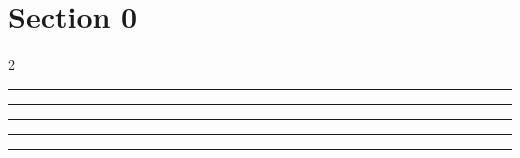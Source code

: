 \documentclass[11pt,a4paper]{article}
\begin{document}
\section{Section 0}
\begin{multicols}{2}
\begin{swarmwrap}%
  \begin{minipage}[t]{2cm}
    \centering
    \textcolor{blue!30}{\rule{\linewidth}{2cm}}
  \end{minipage}%
\end{swarmwrap}%
\swarmwrapnext\lipsum[1]\lipsum[2]
\end{multicols}

\begin{swarmwrap}%
  \begin{minipage}[t]{3cm}
    \centering
    \textcolor{red!20}{\rule{\linewidth}{3cm}}
  \end{minipage}%
\end{swarmwrap}%
\swarmwrapnext\lipsum[1]\lipsum[2]

\begin{swarmwrap}%
  \begin{minipage}[t]{4cm}
    \centering
    \textcolor{red!20}{\rule{\linewidth}{4cm}}
  \end{minipage}%
\end{swarmwrap}%
\swarmwrapnext\lipsum[1]\lipsum[2]\lipsum[3]

\begin{swarmwrap}%
  \begin{minipage}[t]{5cm}
    \centering
    \textcolor{red!20}{\rule{\linewidth}{5cm}}
  \end{minipage}%
\end{swarmwrap}%
\swarmwrapnext\lipsum[1]\lipsum[2]\lipsum[3]\lipsum[4]

\begin{swarmwrap}%
  \begin{minipage}[t]{2cm}
    \centering
    \textcolor{red!20}{\rule{\linewidth}{6cm}}
  \end{minipage}%
\end{swarmwrap}%
\swarmwrapnext\lipsum[1]\lipsum[2]\lipsum[3]\lipsum[4]\lipsum[5]
\end{document}
